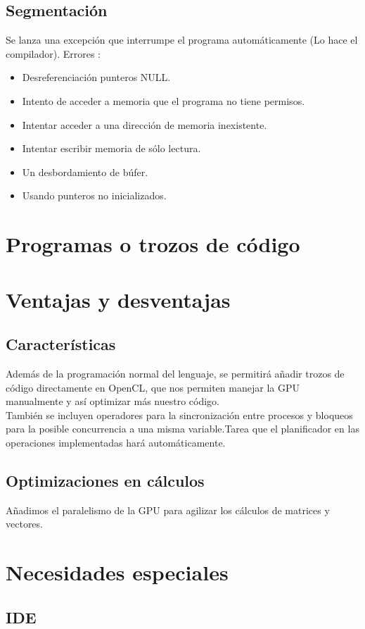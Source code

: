 \documentclass[12pt,a4paper]{article}
\begin{document}
\subsection{Segmentación}
Se lanza una excepción que interrumpe el programa automáticamente (Lo hace el compilador).
Errores :
\begin{itemize}
\item Desreferenciación punteros NULL.
\item Intento de acceder a memoria que el programa no tiene permisos.
\item Intentar acceder a una dirección de memoria inexistente.
\item Intentar escribir memoria de sólo lectura.
\item Un desbordamiento de búfer. 
\item Usando punteros no inicializados.
\end{itemize}
\section{Programas o trozos de código}
\section{Ventajas y desventajas}
\subsection{Características}
Además de la programación normal del lenguaje, se permitirá añadir trozos de código directamente en OpenCL, que nos permiten manejar la GPU manualmente y así optimizar más nuestro código. \\
También se incluyen operadores para la sincronización entre procesos y bloqueos para la posible concurrencia a una misma variable.Tarea que el planificador en las operaciones implementadas hará automáticamente.
\subsection{Optimizaciones en cálculos}
Añadimos el paralelismo de la GPU para agilizar los cálculos de matrices y vectores. 
\section{Necesidades especiales}
\subsection{IDE}
\end{document}

